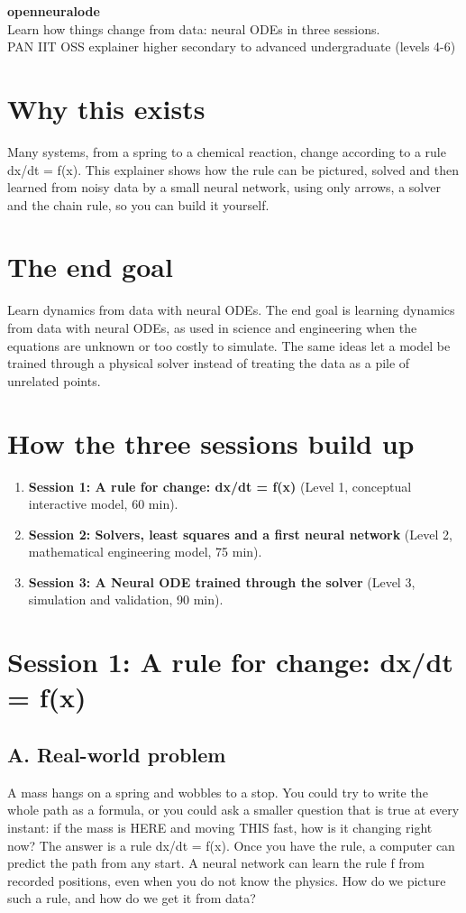 \documentclass[11pt,a4paper]{article}
\begin{document}
\begin{center}{\LARGE\bfseries openneuralode}\\[0.4em]{\large Learn how things change from data: neural ODEs in three sessions.}\\[0.2em]\small PAN IIT OSS explainer \textbullet{} higher secondary to advanced undergraduate (levels 4-6)\end{center}

\section*{Why this exists}
Many systems, from a spring to a chemical reaction, change according to a rule dx/dt = f(x). This explainer shows how the rule can be pictured, solved and then learned from noisy data by a small neural network, using only arrows, a solver and the chain rule, so you can build it yourself.

\section*{The end goal}
Learn dynamics from data with neural ODEs. The end goal is learning dynamics from data with neural ODEs, as used in science and engineering when the equations are unknown or too costly to simulate. The same ideas let a model be trained through a physical solver instead of treating the data as a pile of unrelated points.

\section*{How the three sessions build up}
\begin{enumerate}[nosep]
\item \textbf{Session 1: A rule for change: dx/dt = f(x)} (Level 1, conceptual interactive model, 60 min).
\item \textbf{Session 2: Solvers, least squares and a first neural network} (Level 2, mathematical engineering model, 75 min).
\item \textbf{Session 3: A Neural ODE trained through the solver} (Level 3, simulation and validation, 90 min).
\end{enumerate}

\section{Session 1: A rule for change: dx/dt = f(x)}

\subsection*{A. Real-world problem}
A mass hangs on a spring and wobbles to a stop. You could try to write the whole path as a formula, or you could ask a smaller question that is true at every instant: if the mass is HERE and moving THIS fast, how is it changing right now? The answer is a rule dx/dt = f(x). Once you have the rule, a computer can predict the path from any start. A neural network can learn the rule f from recorded positions, even when you do not know the physics. How do we picture such a rule, and how do we get it from data?
\end{document}
